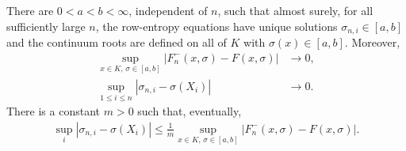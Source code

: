 \begin{proposition}\label{prop:uniform-input}
There are $0<a<b<\infty$, independent of $n$, such that almost surely, for all sufficiently large $n$, the row-entropy equations have unique solutions $\sigma_{n,i}\in[a,b]$ and the continuum roots are defined on all of $K$ with $\sigma(x)\in[a,b]$. Moreover,
\begin{align}\label{eq:uniform-entropy-convergence}
\sup_{x\in K,\,\sigma\in[a,b]}|F_n^-(x,\sigma)-F(x,\sigma)|&\longrightarrow0,\\
\sup_{1\leq i\leq n}|\sigma_{n,i}-\sigma(X_i)|&\longrightarrow0.\label{eq:uniform-bandwidth-convergence}
\end{align}
There is a constant $m>0$ such that, eventually,
\begin{align}\label{eq:inverse-estimate}
\sup_i|\sigma_{n,i}-\sigma(X_i)|
\leq\frac1m\sup_{x\in K,\,\sigma\in[a,b]}|F_n^-(x,\sigma)-F(x,\sigma)|.
\end{align}
\end{proposition}

